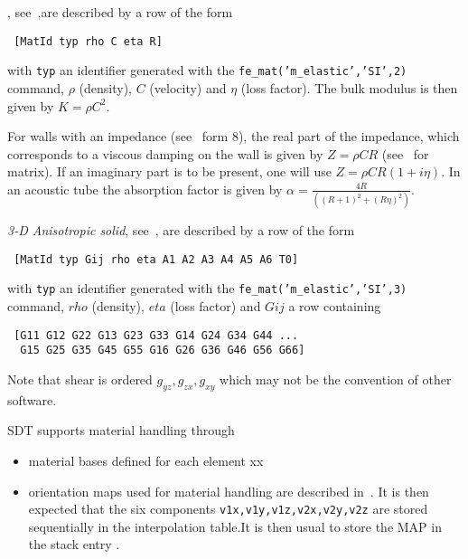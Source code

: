  , see~,are described by a row of the form

\begin{verbatim}
 [MatId typ rho C eta R]
\end{verbatim}


\noindent with {\tt typ} an identifier generated with the {\tt fe\_mat('m\_elastic','SI',2)} command, $\rho$ (density), $C$ (velocity) and $\eta$ (loss factor). The bulk modulus is then given by $K=\rho C^2$. 

For walls with an impedance (see~ form 8), the real part of the impedance, which corresponds to a viscous damping on the wall is given by {\tt $Z=\rho C R$} (see~ for matrix). If an imaginary part is to be present, one will use $Z=\rho C R(1+i \eta)$. In an acoustic tube the absorption factor is given by $\alpha=\frac{4R}{((R+1)^2+(R\eta)^2)}$. 


{\sl 3-D Anisotropic solid}, see~, are described by a row of the form

\begin{verbatim}
 [MatId typ Gij rho eta A1 A2 A3 A4 A5 A6 T0]
\end{verbatim}


with {\tt typ} an identifier generated with the {\tt fe\_mat('m\_elastic','SI',3)} command, $rho$ (density), $eta$ (loss factor) and $Gij$ a row containing 

\begin{verbatim}
 [G11 G12 G22 G13 G23 G33 G14 G24 G34 G44 ...
  G15 G25 G35 G45 G55 G16 G26 G36 G46 G56 G66]
\end{verbatim}

Note that shear is ordered $g_{yz}, g_{zx}, g_{xy}$ which may not be the convention of other software.

SDT supports material handling through 

\begin{itemize}
\item material bases defined for each element xx
\item orientation maps used for material handling are described in~. It is then expected that the six components {\tt v1x,v1y,v1z,v2x,v2y,v2z} are stored sequentially in the interpolation table.It is then usual to store the MAP in the stack entry .
\end{itemize}


